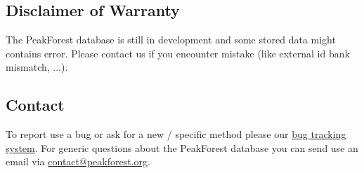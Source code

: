 \subsection{Disclaimer of Warranty}
\hspace*{\parindent}
The PeakForest database is still in development and some stored data might contains error. 
Please contact us if you encounter mistake (like external id bank mismatch, ...). 

\subsection{Contact}
\hspace*{\parindent}
To report use a bug or ask for a new / specific method please our \href{http://TODO-choose-bugtracking}{bug tracking system}. 
For generic questions about the PeakForest database you can send use an email via \href{mailto:contact@peakforest.org?subject=\%5Bwebservice-doc\%5D}{contact@peakforest.org}. 

\newpage


%
%


